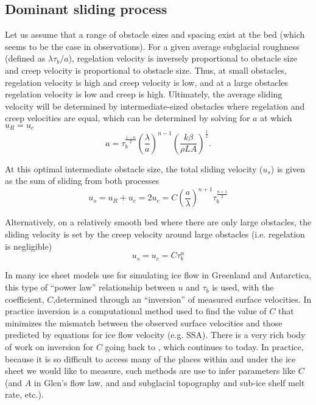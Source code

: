\documentclass[12pt]{article}
\theoremstyle{definition}
\begin{document}
\subsection{Dominant sliding process}
Let us assume that a range of obstacle sizes and spacing exist at the bed (which seems to be the case in observations). For a given average subglacial roughness (defined as $\lambda \tau_b / a$), regelation velocity is inversely proportional to obstacle size and creep velocity is proportional to obstacle size. Thus, at small obstacles, regelation velocity is high and creep velocity is low, and at a large obstacles regelation velocity is low and creep is high.  Ultimately, the average sliding velocity will be determined by intermediate-sized obstacles where regelation and creep velocities are equal, which can be determined by solving for $a$ at which $u_R = u_c$
\begin{equation}
a = \tau_b^{\frac{1-n}{2}} \left(\frac{\lambda}{a} \right)^{n-1} \left( \frac{k \beta}{\rho L A} \right)^{\frac{1}{2}} .
\end{equation}
\begin{shaded}
At this optimal intermediate obstacle size, the total sliding velocity ($u_s$) is given as the sum of sliding from both processes
\begin{equation}
u_s = u_R + u_c = 2u_c = C \left(\frac{a}{\lambda} \right)^{n+1} \tau_b^{\frac{n+1}{2}}
\end{equation}

Alternatively, on a relatively smooth bed where there are only large obstacles, the sliding velocity is set by the creep velocity around large obstacles (i.e. regelation is negligible)
\begin{equation}
u_s = u_c = C \tau_b^n
\end{equation}
\end{shaded}
In many ice sheet models use for simulating ice flow in Greenland and Antarctica, this type of ``power law'' relationship between $u$ and $\tau_b$ is used, with the coefficient, $C$,determined through an ``inversion'' of measured surface velocities. In practice inversion is a computational method used to find the value of $C$ that minimizes the mismatch between the observed surface velocities and those predicted by equations for ice flow velocity (e.g. SSA). There is a very rich body of work on inversion for $C$ going back to \cite{macayeal1993:inversion}, which continues to today. In practice, because it is so difficult to access many of the places within and under the ice sheet we would like to measure, such methods are use to infer parameters like $C$ (and $A$ in Glen's flow law, and and subglacial topography and sub-ice shelf melt rate, etc.).
\end{document}
